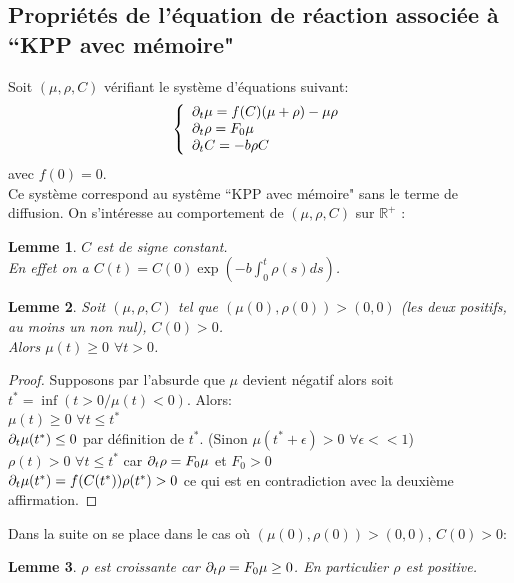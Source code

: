 \documentclass[11pt]{article}
\begin{document}
\fi



\subsection{Propriétés de l'équation de réaction associée à ``KPP avec mémoire"}
\newtheorem{lemma}{Lemme}
Soit $(\mu,\rho,C)$ vérifiant le système d’équations suivant:
\begin{equation} \left\{
                \begin{array}{ll}
                   \partial_t\mu  = f(C)(\mu + \rho) -\mu\rho\\
                 \partial_t\rho=  F_0 \mu \\
                  \partial_t C = -b\rho C
                \end{array}
              \right.
\end{equation} avec $f(0)=0$. \\
Ce système correspond au systême ``KPP avec mémoire" sans le terme de diffusion.
On s’intéresse au comportement de $(\mu,\rho,C)$ sur $\mathbb{R}^+$ : 
\begin{lemma}$C$ est de signe constant.\\
En effet on a $C(t)= C(0)\exp(-b\int_{0}^{t}\rho(s)ds)$.
\end{lemma}

\begin{lemma}Soit $(\mu,\rho,C)$ tel que $(\mu(0),\rho(0))> (0,0)$ (les deux positifs, au moins un non nul), $C(0)>0$.\\  Alors $\mu(t)\geq 0$ $\forall t>0$.
\end{lemma}
\begin{proof}
Supposons par l'absurde que $\mu$ devient négatif alors soit $t^*= \inf(t>0/ \mu(t)<0)$. Alors: \\
$\mu(t)\geq 0$ $\forall t \leq t^*$\\
$\partial_t\mu(t^*) \leq 0$ par définition de $t^*$. (Sinon $\mu(t^*+\epsilon)>0$ $\forall \epsilon <<1$)\\
$\rho(t)>0$ $\forall t\leq t^*$ car $\partial_t\rho=  F_0 \mu$ et $F_0>0$\\
$\partial_t\mu(t^*) = f(C(t^*))\rho(t^*) > 0$ ce qui est en contradiction avec la deuxième affirmation.
\end{proof}
Dans la suite on se place dans le cas où $(\mu(0),\rho(0))> (0,0)$, $C(0)>0$:
\begin{lemma}
 $\rho$ est croissante car $\partial_t\rho=  F_0 \mu \geq 0$. En particulier $\rho$ est positive.
\end{lemma}
\end{document}
